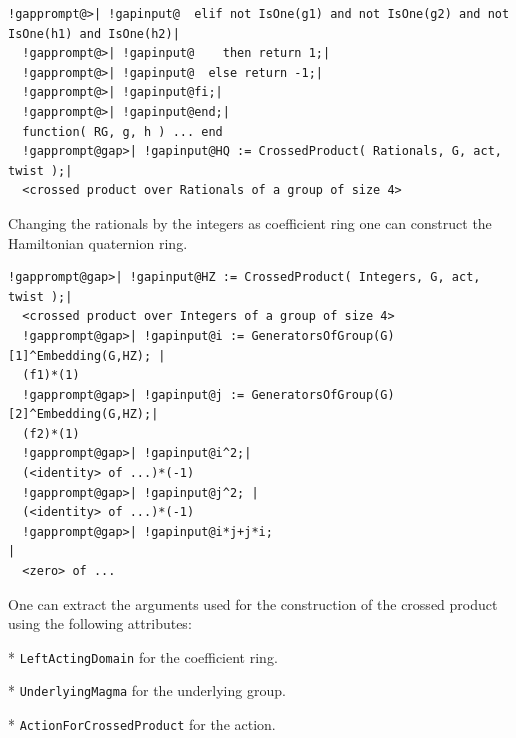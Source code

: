 \documentclass[a4paper,11pt]{report}
\begin{document}
{{{\begin{Verbatim}[commandchars=!@|,fontsize=\small,frame=single,label=Example]
  !gapprompt@>| !gapinput@  elif not IsOne(g1) and not IsOne(g2) and not IsOne(h1) and IsOne(h2)|
  !gapprompt@>| !gapinput@    then return 1;|
  !gapprompt@>| !gapinput@  else return -1;|
  !gapprompt@>| !gapinput@fi;|
  !gapprompt@>| !gapinput@end;|
  function( RG, g, h ) ... end
  !gapprompt@gap>| !gapinput@HQ := CrossedProduct( Rationals, G, act, twist );|
  <crossed product over Rationals of a group of size 4>
\end{Verbatim}
 Changing the rationals by the integers as coefficient ring one can construct
the Hamiltonian quaternion ring. 
\begin{Verbatim}[commandchars=!@|,fontsize=\small,frame=single,label=Example]
  !gapprompt@gap>| !gapinput@HZ := CrossedProduct( Integers, G, act, twist );|
  <crossed product over Integers of a group of size 4>
  !gapprompt@gap>| !gapinput@i := GeneratorsOfGroup(G)[1]^Embedding(G,HZ); |
  (f1)*(1)
  !gapprompt@gap>| !gapinput@j := GeneratorsOfGroup(G)[2]^Embedding(G,HZ);|
  (f2)*(1)
  !gapprompt@gap>| !gapinput@i^2;|
  (<identity> of ...)*(-1)
  !gapprompt@gap>| !gapinput@j^2; |
  (<identity> of ...)*(-1)
  !gapprompt@gap>| !gapinput@i*j+j*i;                                      |
  <zero> of ...
\end{Verbatim}
 One can extract the arguments used for the construction of the crossed product
using the following attributes: 

 *  \texttt{LeftActingDomain} for the coefficient ring. 

 *  \texttt{UnderlyingMagma} for the underlying group. 

 *  \texttt{ActionForCrossedProduct} for the action. 

}}}
\end{document}
